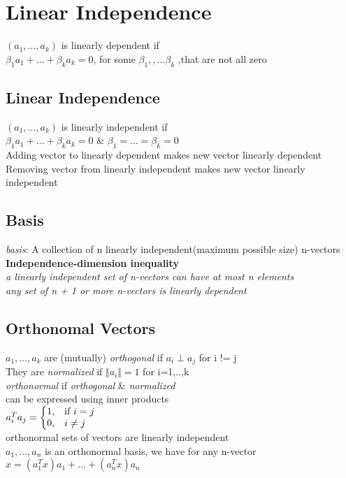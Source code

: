 \section{Linear Independence}
$(a_1,...,a_k)$ is linearly dependent if\\
$\beta_1 a_1+...+\beta_k a_k = 0$, for some $\beta_1,,...\beta_k$ ,that are not all zero
\subsection{Linear Independence}
$(a_1,...,a_k)$ is linearly independent if\\
$\beta_1 a_1+...+\beta_k a_k = 0$ \& $\beta_1 =...= \beta_k =0$\\
\textbullet Adding vector to linearly dependent makes new vector linearly dependent\\
\textbullet Removing vector from linearly independent makes new vector linearly independent\\
\subsection{Basis}
\textit{basis}: A collection of n linearly independent(maximum possible size) n-vectors
\textbf{Independence-dimension inequality}\\
\textbullet \textit{a linearly independent set of n-vectors can have at most n elements}\\
\textbullet \textit{any set of n + 1 or more n-vectors is linearly dependent}

\subsection{Orthonomal Vectors}
$a_1,...,a_k$ are (mutually) \textit{orthogonal} if $a_i \perp a_j$ for i != j\\
They are \textit{normalized} if $\Vert a_i\Vert = 1$ for i=1,..,k\\
\textbullet \textit{orthonormal} if \textit{orthogonal} \& \textit{normalized}\\
\textbullet can be expressed using inner products\\
$
a_i^Ta_j = \left\{
  \begin{array}{@{}ll@{}}
    1, & \text{if}\ i=j \\
    0, & i \neq j
  \end{array}\right.
$\\
\textbullet orthonormal sets of vectors are linearly independent\\
\textbullet $a_1,. . . ,a_n$ is an orthonormal basis, we have for any n-vector $x = ( a^T_1 x ) a_1 +...+ ( a^T_n x ) a_n$
